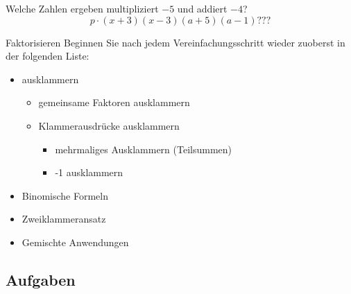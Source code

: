 Welche Zahlen ergeben multipliziert $-5$ und addiert $-4$?
$$p\cdot{}(x+3)(x-3)(a+5)(a-1) ???$$
\begin{center}{}\end{center}



\newpage

\begin{rezept}{Faktorisieren}{}
Beginnen Sie nach jedem Vereinfachungsschritt wieder zuoberst in der
folgenden Liste:

\begin{itemize}
\item ausklammern
 \begin{itemize}
  \item gemeinsame Faktoren ausklammern
  \item Klammerausdrücke ausklammern
   \begin{itemize}
   \item mehrmaliges Ausklammern (Teilsummen)
  \item -1 ausklammern
  \end{itemize}
\end{itemize}
\item Binomische Formeln
\item Zweiklammeransatz
\item Gemischte Anwendungen
\end{itemize}

\end{rezept}

\subsection*{Aufgaben}




\newpage
